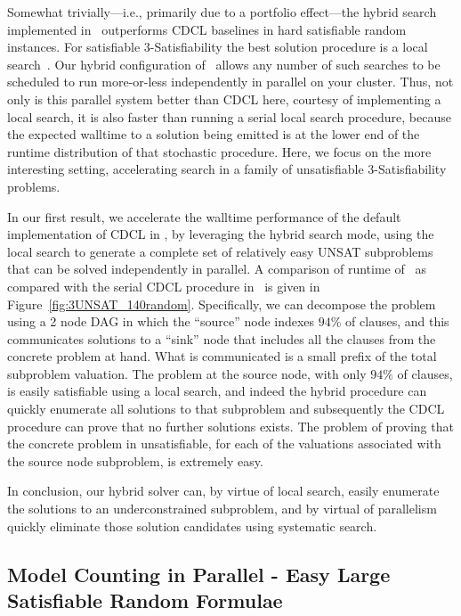 \documentclass[
10pt, %
a4paper, %
oneside, %
headinclude,footinclude, %
BCOR5mm, %
]{scrartcl}
\begin{document}
Somewhat trivially---i.e., primarily due to a portfolio effect---the hybrid search implemented in \dagster\ outperforms CDCL baselines in hard satisfiable random instances.
For satisfiable $3$-Satisfiability the best solution procedure is a local search~\cite{pham:etal:2008}. 
Our hybrid configuration of  \dagster\ allows any number of such searches to be scheduled to run more-or-less independently in parallel on your cluster.
Thus, not only is this parallel system better than CDCL here, courtesy of implementing a local search, it is also faster than running a serial local search procedure, because the expected walltime to a solution being emitted is at the lower end of the runtime distribution of that stochastic procedure.
Here, we focus on the more interesting setting, accelerating search in a family of unsatisfiable $3$-Satisfiability problems.

In our first result, we accelerate the walltime performance of the default implementation of CDCL in \tinisat, by leveraging the hybrid search mode, using the local search to generate a complete set of relatively easy UNSAT subproblems that can be solved independently in parallel.
A comparison of runtime of \dagster\ as compared with the serial CDCL procedure in \tinisat\ is given in Figure~\ref{fig:3UNSAT_140random}. 
Specifically, we can decompose the problem using a 2 node DAG in which the ``source'' node indexes $94\%$ of clauses, and this communicates solutions to a ``sink'' node that includes all the clauses from the concrete problem at hand.
What is communicated is a small prefix of the total subproblem valuation. 
The problem at the source node, with only  $94\%$ of clauses, is easily satisfiable using a local search, and indeed the hybrid procedure can quickly enumerate all solutions to that subproblem and subsequently the CDCL procedure can prove that no further solutions exists.
The problem of proving that the concrete problem in unsatisfiable, for each of the valuations associated with the source node subproblem, is extremely easy.

%



In conclusion, our hybrid solver can, by virtue of local search, easily enumerate the solutions to an underconstrained subproblem, and by virtual of parallelism quickly eliminate those solution candidates using systematic search. 

\subsection{Model Counting in Parallel - Easy Large Satisfiable Random Formulae}\label{sec:easy_large_problems}
\end{document}
